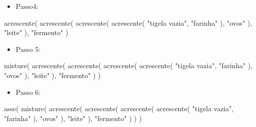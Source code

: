 \documentclass[
  10pt,
  ignorenonframetext,
]{beamer}
\newenvironment{Shaded}{\begin{snugshade}}{\end{snugshade}}
\newcommand{\FunctionTok}[1]{\textcolor[rgb]{0.28,0.35,0.67}{#1}}
\newcommand{\NormalTok}[1]{\textcolor[rgb]{0.00,0.23,0.31}{#1}}
\newcommand{\StringTok}[1]{\textcolor[rgb]{0.13,0.47,0.30}{#1}}
\providecommand{\tightlist}{%
  \setlength{\itemsep}{0pt}\setlength{\parskip}{0pt}}\usepackage{longtable,booktabs,array}
\begin{document}
\begin{frame}[fragile]
\begin{itemize}
\tightlist
\item
  Passo4:
\end{itemize}

\begin{Shaded}
\begin{Highlighting}[]
\FunctionTok{acrescente}\NormalTok{(}
  \FunctionTok{acrescente}\NormalTok{(}
    \FunctionTok{acrescente}\NormalTok{(}
      \FunctionTok{acrescente}\NormalTok{(}
        \StringTok{"tigela vazia"}\NormalTok{,}
        \StringTok{"farinha"}
\NormalTok{      ),}
      \StringTok{"ovos"}
\NormalTok{    ),}
    \StringTok{"leite"}
\NormalTok{  ),}
  \StringTok{"fermento"}
\NormalTok{)}
\end{Highlighting}
\end{Shaded}
\end{frame}

\begin{frame}[fragile]
\begin{itemize}
\tightlist
\item
  Passo 5:
\end{itemize}

\begin{Shaded}
\begin{Highlighting}[]
\FunctionTok{misture}\NormalTok{(}
  \FunctionTok{acrescente}\NormalTok{(}
    \FunctionTok{acrescente}\NormalTok{(}
      \FunctionTok{acrescente}\NormalTok{(}
        \FunctionTok{acrescente}\NormalTok{(}
          \StringTok{"tigela vazia"}\NormalTok{,}
          \StringTok{"farinha"}
\NormalTok{        ),}
        \StringTok{"ovos"}
\NormalTok{      ),}
      \StringTok{"leite"}
\NormalTok{    ),}
    \StringTok{"fermento"}
\NormalTok{  )}
\NormalTok{)}
\end{Highlighting}
\end{Shaded}
\end{frame}

\begin{frame}[fragile]
\begin{itemize}
\tightlist
\item
  Passo 6:
\end{itemize}

\begin{Shaded}
\begin{Highlighting}[]
\FunctionTok{asse}\NormalTok{(}
  \FunctionTok{misture}\NormalTok{(}
    \FunctionTok{acrescente}\NormalTok{(}
      \FunctionTok{acrescente}\NormalTok{(}
        \FunctionTok{acrescente}\NormalTok{(}
          \FunctionTok{acrescente}\NormalTok{(}
            \StringTok{"tigela vazia"}\NormalTok{,}
            \StringTok{"farinha"}
\NormalTok{          ),}
          \StringTok{"ovos"}
\NormalTok{        ),}
        \StringTok{"leite"}
\NormalTok{      ),}
      \StringTok{"fermento"}
\NormalTok{    )}
\NormalTok{  )}
\NormalTok{)}
\end{Highlighting}
\end{Shaded}
\end{frame}
\end{document}
